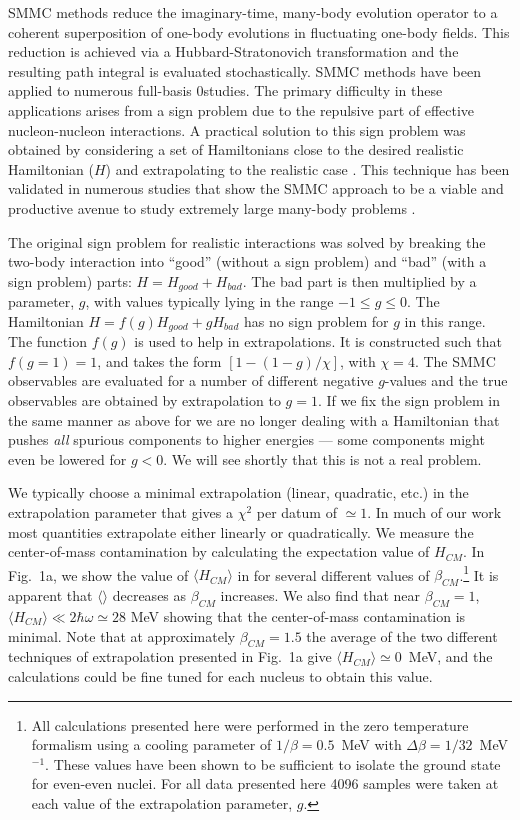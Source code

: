 \begin{multicols}{2}
SMMC methods reduce the imaginary-time, many-body evolution operator to
a coherent superposition of one-body evolutions in fluctuating
one-body fields.  This reduction is achieved via a
Hubbard-Stratonovich transformation and the resulting path integral is
evaluated stochastically.  SMMC methods have been applied to numerous
full-basis 0\hw studies.  The primary difficulty in these applications
arises from a sign problem due to the repulsive part of effective
nucleon-nucleon interactions.  A practical solution to this sign
problem was obtained by considering a set of Hamiltonians close to the
desired realistic Hamiltonian ($H$) and extrapolating to the
realistic case \cite{r:sign}.  This technique has been validated in
numerous studies that show the SMMC approach to be a viable and
productive avenue to study extremely large many-body problems
\cite{r:smmc_pr,r:smmc_ar,r:lang}.

The original sign problem for realistic interactions was solved by
breaking the two-body interaction into ``good'' (without a sign
problem) and ``bad'' (with a sign problem) parts: $ H = H_{good} +
H_{bad}$.  The bad part is then multiplied by a parameter, $g$, with
values typically lying in the range $-1 \le g \le 0$.  The Hamiltonian
$ H = f(g) H_{good} + g H_{bad}$ has no sign problem for $g$ in this
range.  The function $f(g)$ is
used to help in extrapolations. It is constructed such that $f(g=1)=1$, and
takes the form $[1-(1-g)/\chi]$, with $\chi=4$.
The SMMC observables are evaluated for a number of different
negative $g$-values and the true observables are obtained by
extrapolation to $g = 1$.  If we fix the sign problem in the same
manner as above for \hcm we are no longer dealing with a Hamiltonian
that pushes {\it all} spurious components to higher energies --- some
components might even be lowered for $g < 0$. We will see shortly that
this is not a real problem.

We typically choose a minimal extrapolation (linear, quadratic, etc.)
in the extrapolation parameter that gives a $\chi^2$ per datum of
$\simeq 1$. In much of our work most quantities extrapolate either
linearly or quadratically.  We measure the center-of-mass contamination by
calculating the expectation value of $H_{CM}$.  In Fig.~1a, we show
the value of $\langle H_{CM} \rangle$ in  for several different
values of $\beta_{CM}$.\footnote{All calculations presented here
were performed in the zero temperature formalism \cite{r:lang}
using a cooling parameter of $1/\beta =
0.5$~MeV with $\Delta\beta = 1/32$~MeV$^{-1}$.  These values have
been shown to be sufficient to isolate the ground state for
even-even nuclei.  For all data presented here 4096 samples were
taken at each value of the extrapolation parameter, $g$.}  It is
apparent that $\langle$\hcm$\rangle$ decreases as $\beta_{CM}$
increases.  We also find that near $\beta_{CM} = 1$, $\langle H_{CM}
\rangle \ll 2\hbar\omega \simeq 28$ MeV showing that the center-of-mass
contamination
is minimal.  Note that at approximately $\beta_{CM}=1.5$ the average
of the two different techniques of extrapolation presented in Fig.~1a
give $\langle H_{CM} \rangle \simeq 0$~MeV, and the calculations could
be fine tuned for each nucleus to obtain this value.


\end{multicols}
